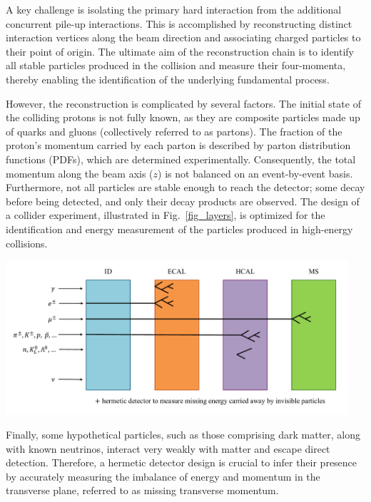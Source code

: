 A key challenge is isolating the primary hard interaction from the additional concurrent pile-up interactions. This is accomplished by reconstructing distinct interaction vertices along the beam direction and associating charged particles to their point of origin. The ultimate aim of the reconstruction chain is to identify all stable particles produced in the collision and measure their four-momenta, thereby enabling the identification of the underlying fundamental process.

However, the reconstruction is complicated by several factors. The initial state of the colliding protons is not fully known, as they are composite particles made up of quarks and gluons (collectively referred to as partons). The fraction of the proton's momentum carried by each parton is described by parton distribution functions (PDFs), which are determined experimentally. Consequently, the total momentum along the beam axis ($z$) is not balanced on an event-by-event basis. Furthermore, not all particles are stable enough to reach the detector; some decay before being detected, and only their decay products are observed. The design of a collider experiment, illustrated in Fig.~\ref{fig_layers}, is optimized for the identification and energy measurement of the particles produced in high-energy collisions.

\begin{center}
    \includegraphics[width=0.95\textwidth]{Images/Layers.pdf}
    \label{fig_layers}
\end{center}

Finally, some hypothetical particles, such as those comprising dark matter, along with known neutrinos, interact very weakly with matter and escape direct detection. Therefore, a hermetic detector design is crucial to infer their presence by accurately measuring the imbalance of energy and momentum in the transverse plane, referred to as missing transverse momentum.


